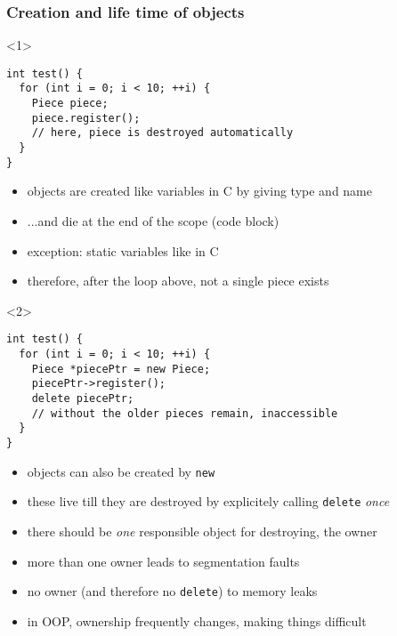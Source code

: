 \documentclass{slides}
\begin{document}
\begin{frame}
  \frametitle{Creation and life time of objects}

  \begin{onlyenv}<1>
\begin{lstlisting}
int test() {
  for (int i = 0; i < 10; ++i) {
    Piece piece;
    piece.register();
    // here, piece is destroyed automatically
  }
}
\end{lstlisting}

    \begin{itemize}
    \item objects are created like variables in C by giving type and name
    \item ...and die at the end of the scope (code block)
    \item exception: static variables like in C
    \item therefore, after the loop above, not a single piece exists
    \end{itemize}
  \end{onlyenv}

  \begin{onlyenv}<2>
\begin{lstlisting}
int test() {
  for (int i = 0; i < 10; ++i) {
    Piece *piecePtr = new Piece;
    piecePtr->register();
    delete piecePtr;
    // without the older pieces remain, inaccessible
  }
}
\end{lstlisting}

    \begin{itemize}
    \item objects can also be created by \lstinline!new!
    \item these live till they are destroyed by explicitely calling
      \lstinline!delete! \emph{once}
    \item there should be \emph{one} responsible object for
      destroying, the \alert{owner}
    \item more than one owner leads to segmentation faults
    \item no owner (and therefore no \lstinline!delete!) to memory leaks
    \item in OOP, ownership frequently changes, making things
      difficult
    \end{itemize}
  \end{onlyenv}
\end{frame}
\end{document}
